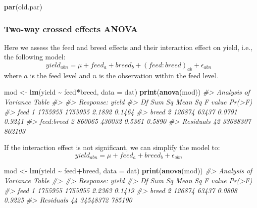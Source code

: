 \documentclass[
]{article}
\newenvironment{Shaded}{\begin{snugshade}}{\end{snugshade}}
\newcommand{\AttributeTok}[1]{\textcolor[rgb]{0.13,0.29,0.53}{#1}}
\newcommand{\CommentTok}[1]{\textcolor[rgb]{0.56,0.35,0.01}{\textit{#1}}}
\newcommand{\FunctionTok}[1]{\textcolor[rgb]{0.13,0.29,0.53}{\textbf{#1}}}
\newcommand{\NormalTok}[1]{#1}
\newcommand{\OtherTok}[1]{\textcolor[rgb]{0.56,0.35,0.01}{#1}}
\newcommand{\SpecialCharTok}[1]{\textcolor[rgb]{0.81,0.36,0.00}{\textbf{#1}}}
\begin{document}
\begin{Shaded}
\begin{Highlighting}[]
\FunctionTok{par}\NormalTok{(old.par)}
\end{Highlighting}
\end{Shaded}

\subsubsection{Two-way crossed effects
ANOVA}\label{two-way-crossed-effects-anova}

Here we assess the feed and breed effects and their interaction effect
on yield, i.e., the following model:
\[yield_{abn} = \mu + feed_a + breed_b + (feed:breed)_{ab} + \epsilon_{abn}\]
where \(a\) is the feed level and \(n\) is the observation within the
feed level.

\begin{Shaded}
\begin{Highlighting}[]
\NormalTok{mod }\OtherTok{\textless{}{-}} \FunctionTok{lm}\NormalTok{(yield }\SpecialCharTok{\textasciitilde{}}\NormalTok{ feed}\SpecialCharTok{*}\NormalTok{breed, }\AttributeTok{data =}\NormalTok{ dat)}
\FunctionTok{print}\NormalTok{(}\FunctionTok{anova}\NormalTok{(mod))}
\CommentTok{\#\textgreater{} Analysis of Variance Table}
\CommentTok{\#\textgreater{} }
\CommentTok{\#\textgreater{} Response: yield}
\CommentTok{\#\textgreater{}            Df   Sum Sq Mean Sq F value Pr(\textgreater{}F)}
\CommentTok{\#\textgreater{} feed        1  1755955 1755955  2.1892 0.1464}
\CommentTok{\#\textgreater{} breed       2   126874   63437  0.0791 0.9241}
\CommentTok{\#\textgreater{} feed:breed  2   860065  430032  0.5361 0.5890}
\CommentTok{\#\textgreater{} Residuals  42 33688307  802103}
\end{Highlighting}
\end{Shaded}

If the interaction effect is not significant, we can simplify the model
to: \[yield_{abn} = \mu + feed_a + breed_b + \epsilon_{abn}\]

\begin{Shaded}
\begin{Highlighting}[]
\NormalTok{mod }\OtherTok{\textless{}{-}} \FunctionTok{lm}\NormalTok{(yield }\SpecialCharTok{\textasciitilde{}}\NormalTok{ feed}\SpecialCharTok{+}\NormalTok{breed, }\AttributeTok{data =}\NormalTok{ dat)}
\FunctionTok{print}\NormalTok{(}\FunctionTok{anova}\NormalTok{(mod))}
\CommentTok{\#\textgreater{} Analysis of Variance Table}
\CommentTok{\#\textgreater{} }
\CommentTok{\#\textgreater{} Response: yield}
\CommentTok{\#\textgreater{}           Df   Sum Sq Mean Sq F value Pr(\textgreater{}F)}
\CommentTok{\#\textgreater{} feed       1  1755955 1755955  2.2363 0.1419}
\CommentTok{\#\textgreater{} breed      2   126874   63437  0.0808 0.9225}
\CommentTok{\#\textgreater{} Residuals 44 34548372  785190}
\end{Highlighting}
\end{Shaded}
\end{document}
